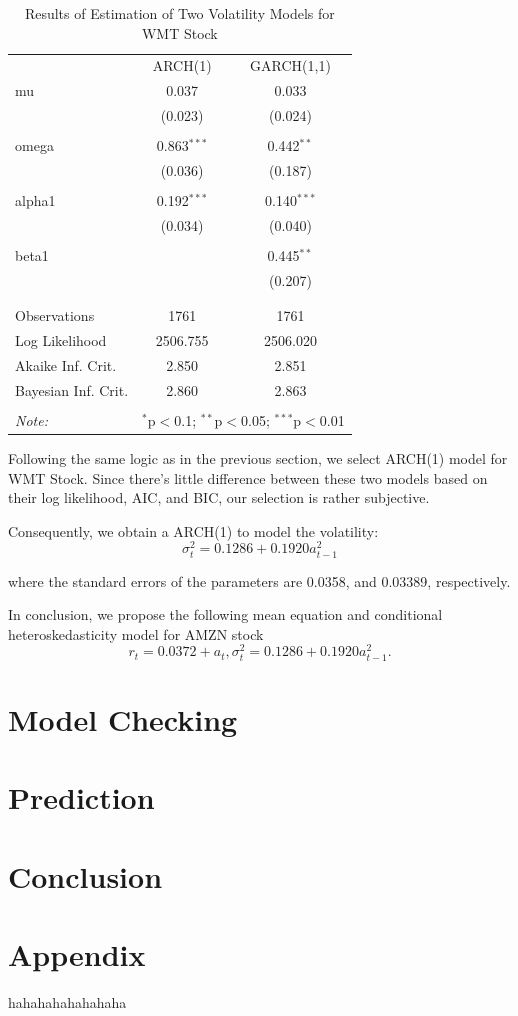 \documentclass[paper=a4, fontsize=13pt]{article}
\begin{document}
\begin{table}[!htbp] \centering 
  \caption{Results of Estimation of Two Volatility Models for WMT Stock} 
  \label{} 
\begin{tabular}{@{\extracolsep{5pt}}lcc} 
\\[-1.8ex]\hline 
\hline
 & ARCH(1) & GARCH(1,1) \\ 
 mu & 0.037 & 0.033 \\ 
  & (0.023) & (0.024) \\ 
  & & \\ 
 omega & 0.863$^{***}$ & 0.442$^{**}$ \\ 
  & (0.036) & (0.187) \\ 
  & & \\ 
 alpha1 & 0.192$^{***}$ & 0.140$^{***}$ \\ 
  & (0.034) & (0.040) \\ 
  & & \\ 
 beta1 &  & 0.445$^{**}$ \\ 
  &  & (0.207) \\ 
  & & \\ 
\hline \\[-1.8ex] 
Observations & 1761 & 1761 \\ 
Log Likelihood & 2506.755 & 2506.020 \\ 
Akaike Inf. Crit. & 2.850 & 2.851 \\ 
Bayesian Inf. Crit. & 2.860 & 2.863 \\ 
\hline 
\hline \\[-1.8ex] 
\textit{Note:}  & \multicolumn{2}{r}{$^{*}$p$<$0.1; $^{**}$p$<$0.05; $^{***}$p$<$0.01} \\ 
\end{tabular} 
\end{table} 

Following the same logic as in the previous section, we select ARCH(1) model for WMT Stock. Since there’s little difference between these two models based on their log likelihood, AIC, and BIC, our selection is rather subjective.

Consequently, we obtain a ARCH(1) to model the volatility:
\[ \sigma_t^2 = 0.1286+0.1920 a_{t-1}^2 \]

where the standard errors of the parameters are 0.0358, and 0.03389, respectively.

In conclusion, we propose the following mean equation and conditional heteroskedasticity model for AMZN stock
\[ r_t = 0.0372+a_t, \sigma_t^2 = 0.1286+0.1920a_{t-1}^2. \]

\section{Model Checking}

\section{Prediction}

\section{Conclusion}

\section{Appendix}

\begin{thebibliography}{99}
 hahahahahahahaha
\end{thebibliography}
\end{document}
